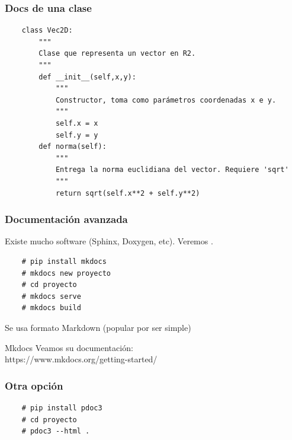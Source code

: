 \documentclass[14pt,aspectratio=169,xcolor=dvipsnames]{beamer}
\begin{document}
\begin{frame}[fragile]\frametitle{Docs de una clase}
    \begin{footnotesize}
    \begin{verbatim}
    class Vec2D:
        """
        Clase que representa un vector en R2.
        """
        def __init__(self,x,y):
            """
            Constructor, toma como parámetros coordenadas x e y.
            """
            self.x = x
            self.y = y
        def norma(self):
            """
            Entrega la norma euclidiana del vector. Requiere 'sqrt'
            """
            return sqrt(self.x**2 + self.y**2)
    \end{verbatim}

    \vspace{-1cm}
    \hfill    {}
    \end{footnotesize}
\end{frame}
\begin{frame}[fragile]\frametitle{Documentación avanzada}
    Existe mucho software (Sphinx, Doxygen, etc). Veremos .

    \begin{verbatim}
    # pip install mkdocs
    # mkdocs new proyecto
    # cd proyecto
    # mkdocs serve
    # mkdocs build
    \end{verbatim} 

    \vspace{1cm}
    Se usa formato Markdown (popular por ser simple)

\end{frame}
\begin{frame}{Mkdocs}
    Veamos su documentación: \\https://www.mkdocs.org/getting-started/
\end{frame}
\begin{frame}[fragile]\frametitle{Otra opción}
    \begin{verbatim}
    # pip install pdoc3
    # cd proyecto
    # pdoc3 --html .
    \end{verbatim}

\end{frame}
\end{document}
